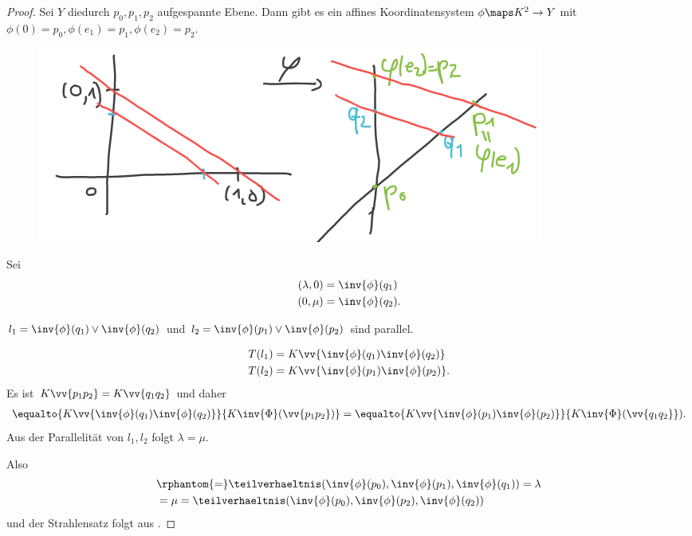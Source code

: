 \begin{proof}
    Sei \( Y \) diedurch \( p_0,p_1,p_2 \) aufgespannte Ebene. Dann gibt es ein affines Koordinatensystem \( \phi\maps K^2 \to Y \) mit \( \phi(0)=p_0, \phi(e_1)=p_1, \phi(e_2)=p_2 \).
    \begin{figure}[H]
        \centering
        \includegraphics[width=0.5\linewidth]{figures/strahlensatz_koordinatensystem}
        \label{fig:strahlensatz_koordinatensystem}
    \end{figure}
    Sei
    \begin{align*}
        (\lambda,0)&=\inv{\phi}(q_1)\\
        (0,\mu)&=\inv{\phi}(q_2).
    \end{align*}    
    \begin{behauptung*}
        \( l_1=\inv{\phi}(q_1)\vee \inv{\phi}(q_2) \) und \( l_2=\inv{\phi}(p_1)\vee \inv{\phi}(p_2) \) sind parallel.
    \end{behauptung*}
    \begin{align*}
        T(l_1)&=K\vv{\inv{\phi}(q_1) \inv{\phi}(q_2)}\\
        T(l_2)&=K\vv{\inv{\phi}(p_1) \inv{\phi}(p_2)}.
    \end{align*}
    Es ist \( K\vv{p_1 p_2}=K\vv{q_1 q_2} \) und daher
    \begin{align*}
        \equalto{K\vv{\inv{\phi}(q_1) \inv{\phi}(q_2)}}{K \inv{\Phi}(\vv{p_1 p_2})}=\equalto{K\vv{\inv{\phi}(p_1) \inv{\phi}(p_2)}}{K\inv{\Phi}(\vv{q_1 q_2}}).
    \end{align*}
    Aus der Parallelität von \( l_1,l_2 \) folgt \( \lambda=\mu \).

    Also
    \begin{align*}
        &\rphantom{=}\teilverhaeltnis(\inv{\phi}(p_0),\inv{\phi}(p_1),\inv{\phi}(q_1))=\lambda\\
        &=\mu=\teilverhaeltnis(\inv{\phi}(p_0),\inv{\phi}(p_2),\inv{\phi}(q_2))
    \end{align*}
    und der Strahlensatz folgt aus .
\end{proof}
